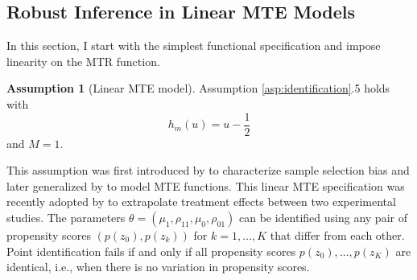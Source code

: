 \documentclass[11pt]{article}
\theoremstyle{definition}
\newtheorem{assumption}{Assumption}
\newcommand{\0}{\ensuremath{\mathbf{0}}}
\begin{document}
\begin{bibunit}
\section{Robust Inference in Linear MTE Models}
\label{sec:linearMTE_inference}
In this section, I start with the simplest functional specification and impose linearity on the MTR function. 
\begin{assumption}[Linear MTE model]
\label{asp:linear_MTE}
Assumption \ref{asp:identification}.5 holds with 
\[
	h_m(u) = u - \frac{1}{2}
\]
and $M=1$.
\end{assumption}
This assumption was first introduced by \cite{olsen:1980} to characterize sample selection bias and later generalized by \cite{brinch/mogstad/wiswall:2017} to model MTE functions. This linear MTE specification was recently adopted by \cite{kowalski:2023} to extrapolate treatment effects between two experimental studies. The parameters $\theta = (\mu_1, \rho_{11}, \mu_0, \rho_{01})$ can be identified using any pair of propensity scores $(p(z_0), p(z_k))$ for $k = 1,\ldots,K$ that differ from each other. Point identification fails if and only if all propensity scores ${p(z_0),\ldots,p(z_K)}$ are identical, i.e., when there is no variation in propensity scores.


\end{bibunit}
\end{document}
